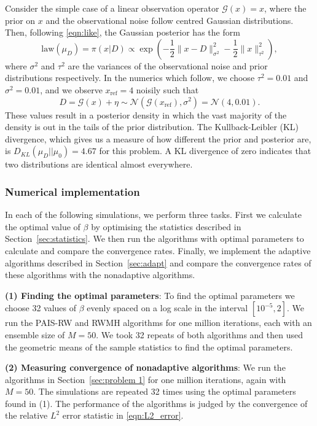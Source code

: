 \documentclass[final]{siamltex}
\newcommand{\G}{\mathcal{G}}
\begin{document}
Consider the simple case of a linear observation operator $\G(x) = x$,
where the prior on $x$ and the observational noise follow centred
Gaussian distributions. Then, following \eqref{eqn:like}, the Gaussian
posterior has the form
\begin{equation}\label{eqn:Gaussian posterior}
	\text{law}(\mu_D) = \pi(x|D) \propto \exp\left(-\frac{1}{2}\big\|x - D\big\|^2_{\sigma^2} - \frac{1}{2}\big\|x\big\|^2_{\tau^2}\right),
\end{equation}
where $\sigma^2$ and $\tau^2$ are the variances of the
observational noise and prior distributions respectively. In the
numerics which follow, we choose $\tau^2 =0.01$ and $\sigma^2 = 0.01$,
and we observe $x_\text{ref}=4$ noisily such that
\[
D = \mathcal{G}(x) + \eta \sim \mathcal{N}(\mathcal{G}(x_\text{ref}),\sigma^2) = \mathcal{N}(4,0.01).
\]
These values result in a posterior density in which the vast majority
of the density is out in the tails of the
prior distribution. The Kullback-Leibler (KL)
divergence, which gives us a measure of how different the prior and
posterior are, is $D_{KL}(\mu_D || \mu_0) = 4.67$ for this
problem. A KL divergence of zero indicates that two distributions are
identical almost everywhere.

\subsubsection{Numerical implementation}\label{sec:Implementation P1}

In each of the following simulations, we perform three tasks. First we
calculate the optimal value of $\beta$ by optimising the statistics
described in Section~\ref{sec:statistics}. We then run the algorithms
with optimal parameters to calculate and compare the convergence
rates. Finally, we implement the adaptive algorithms described in
Section~\ref{sec:adapt} and compare the convergence rates of these
algorithms with the nonadaptive algorithms.

{\bf (1) Finding the optimal parameters}: To find the optimal
parameters we choose 32 values of $\beta$ evenly spaced on a log scale
in the interval $[10^{-5}, 2]$. We run the PAIS-RW and RWMH algorithms
for one million iterations, each with an ensemble size of $M=50$. We took
32 repeats of both algorithms and then used the geometric means of the
sample statistics to find the optimal parameters.

{\bf (2) Measuring convergence of nonadaptive algorithms}: We run the
algorithms in Section~\ref{sec:problem 1} for one million iterations,
again with $M=50$. The simulations are repeated 32 times using the
optimal parameters found in (1). The performance of the algorithms is
judged by the convergence of the relative $L^2$ error statistic in
\eqref{eqn:L2_error}.
\end{document}
